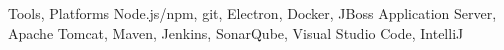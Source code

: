\cvitem
{
  Tools, Platforms
}
{
  Node.js/npm, git, Electron, Docker,
  JBoss Application Server, Apache Tomcat, Maven, Jenkins, SonarQube,
  Visual Studio Code, IntelliJ
}
